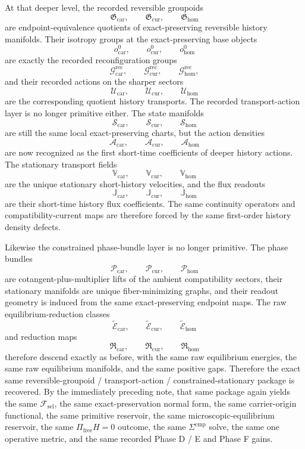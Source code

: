 \documentclass[11pt]{article}
\newcommand{\StemFunctional}{\mathscr F_{\mathrm{sel}}}
\newcommand{\RootTensorClass}{\mathscr U_{\mathrm{car}}}
\newcommand{\RootRelabelClass}{\mathscr U_{\mathrm{cur}}}
\newcommand{\RootFreeClass}{\mathscr U_{\mathrm{hom}}}
\newcommand{\TensorReconGroup}{\mathcal G_{\mathrm{car}}^{\mathrm{rec}}}
\newcommand{\CurReconGroup}{\mathcal G_{\mathrm{cur}}^{\mathrm{rec}}}
\newcommand{\HomReconGroup}{\mathcal G_{\mathrm{hom}}^{\mathrm{rec}}}
\newcommand{\TensorStateManifold}{\mathcal S_{\mathrm{car}}}
\newcommand{\CurStateManifold}{\mathcal S_{\mathrm{cur}}}
\newcommand{\HomStateManifold}{\mathcal S_{\mathrm{hom}}}
\newcommand{\TensorTransport}{\mathbb V_{\mathrm{car}}}
\newcommand{\CurTransport}{\mathbb V_{\mathrm{cur}}}
\newcommand{\HomTransport}{\mathbb V_{\mathrm{hom}}}
\newcommand{\TensorFlux}{\mathbb J_{\mathrm{car}}}
\newcommand{\CurFlux}{\mathbb J_{\mathrm{cur}}}
\newcommand{\HomFlux}{\mathbb J_{\mathrm{hom}}}
\newcommand{\TensorRawEqClass}{\widetilde{\mathscr E}_{\mathrm{car}}}
\newcommand{\CurRawEqClass}{\widetilde{\mathscr E}_{\mathrm{cur}}}
\newcommand{\HomRawEqClass}{\widetilde{\mathscr E}_{\mathrm{hom}}}
\newcommand{\TensorEqReduce}{\mathfrak R_{\mathrm{car}}}
\newcommand{\CurEqReduce}{\mathfrak R_{\mathrm{cur}}}
\newcommand{\HomEqReduce}{\mathfrak R_{\mathrm{hom}}}
\newcommand{\TensorGroupoid}{\mathfrak G_{\mathrm{car}}}
\newcommand{\CurGroupoid}{\mathfrak G_{\mathrm{cur}}}
\newcommand{\HomGroupoid}{\mathfrak G_{\mathrm{hom}}}
\newcommand{\TensorObjBase}{o_{\mathrm{car}}^0}
\newcommand{\CurObjBase}{o_{\mathrm{cur}}^0}
\newcommand{\HomObjBase}{o_{\mathrm{hom}}^0}
\newcommand{\TensorActionDensity}{\mathscr A_{\mathrm{car}}}
\newcommand{\CurActionDensity}{\mathscr A_{\mathrm{cur}}}
\newcommand{\HomActionDensity}{\mathscr A_{\mathrm{hom}}}
\newcommand{\TensorPhaseClass}{\mathscr P_{\mathrm{car}}}
\newcommand{\CurPhaseClass}{\mathscr P_{\mathrm{cur}}}
\newcommand{\HomPhaseClass}{\mathscr P_{\mathrm{hom}}}
\begin{document}
At that deeper level, the recorded reversible groupoids
\[
\TensorGroupoid,\qquad
\CurGroupoid,\qquad
\HomGroupoid
\]
are endpoint-equivalence quotients of exact-preserving reversible history manifolds. Their isotropy groups at the exact-preserving base objects
\[
\TensorObjBase,\qquad
\CurObjBase,\qquad
\HomObjBase
\]
are exactly the recorded reconfiguration groups
\[
\TensorReconGroup,\qquad
\CurReconGroup,\qquad
\HomReconGroup,
\]
and their recorded actions on the sharper sectors
\[
\RootTensorClass,\qquad
\RootRelabelClass,\qquad
\RootFreeClass
\]
are the corresponding quotient history transports. The recorded transport-action layer is no longer primitive either. The state manifolds
\[
\TensorStateManifold,\qquad
\CurStateManifold,\qquad
\HomStateManifold
\]
are still the same local exact-preserving charts, but the action densities
\[
\TensorActionDensity,\qquad
\CurActionDensity,\qquad
\HomActionDensity
\]
are now recognized as the first short-time coefficients of deeper history actions. The stationary transport fields
\[
\TensorTransport,\qquad
\CurTransport,\qquad
\HomTransport
\]
are the unique stationary short-history velocities, and the flux readouts
\[
\TensorFlux,\qquad
\CurFlux,\qquad
\HomFlux
\]
are their short-time history flux coefficients. The same continuity operators and compatibility-current maps are therefore forced by the same first-order history density defects.

Likewise the constrained phase-bundle layer is no longer primitive. The phase bundles
\[
\TensorPhaseClass,\qquad
\CurPhaseClass,\qquad
\HomPhaseClass
\]
are cotangent-plus-multiplier lifts of the ambient compatibility sectors, their stationary manifolds are unique fiber-minimizing graphs, and their readout geometry is induced from the same exact-preserving endpoint maps. The raw equilibrium-reduction classes
\[
\TensorRawEqClass,\qquad
\CurRawEqClass,\qquad
\HomRawEqClass
\]
and reduction maps
\[
\TensorEqReduce,\qquad
\CurEqReduce,\qquad
\HomEqReduce
\]
therefore descend exactly as before, with the same raw equilibrium energies, the same raw equilibrium manifolds, and the same positive gaps. Therefore the exact same reversible-groupoid / transport-action / constrained-stationary package is recovered. By the immediately preceding note, that same package again yields the same \(\StemFunctional\), the same exact-preservation normal form, the same carrier-origin functional, the same primitive reservoir, the same microscopic-equilibrium reservoir, the same \(\Pi_{\mathrm{free}}H=0\) outcome, the same \(\Sigma^{\mathrm{cmp}}\) solve, the same one operative metric, and the same recorded Phase D / E and Phase F gains.
\end{document}
